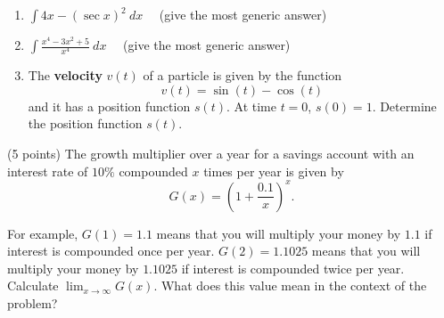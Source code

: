 \documentclass[12pt]{article}
\renewcommand{\emph}[1]{\textsf{\textbf{#1}}}
\newcounter{probcount}
\newcounter{subprobcount}
\newenvironment{subproblems}{%
\begin{enumerate}%
\setcounter{enumi}{\value{subprobcount}}%
\renewcommand{\theenumi}{\emph{\alph{enumi}}}}%
{\setcounter{subprobcount}{\value{enumi}}\end{enumerate}}
\begin{document}
\begin{subproblems}


	\item $\displaystyle{ \int 4x - (\sec x)^{2}\ dx} \quad$ (give the most generic answer)

	\vfill
	
		\item $\displaystyle{ \int \frac{x^4-3x^2+5}{x^4} \ dx} \quad$ (give the most generic answer)
	\vfill


	\item The \emph{velocity} $v(t)$ of a particle is given by the function
	\[ v(t) = \sin(t) - \cos(t)\]
	and it has a position function $s(t)$. At time $t = 0$, $s(0) = 1$. Determine the  position function $s(t)$.
	\vfill

\end{subproblems}

\newpage


\newpage


 (5 points)
The growth multiplier over a year for a savings account with an interest rate of $10\%$ compounded $x$ times per year is given by \[G(x) = \left(1+\frac{0.1}{x}\right)^x.\] 

For example, $G(1)=1.1$ means that you will multiply your money by $1.1$ if interest is compounded once per year. $G(2)=1.1025$ means that you will multiply your money by $1.1025$ if interest is compounded twice per year.\\

Calculate $\displaystyle \lim_{x \rightarrow \infty} G(x)$. What does this value mean in the context of the problem?
\end{document}
